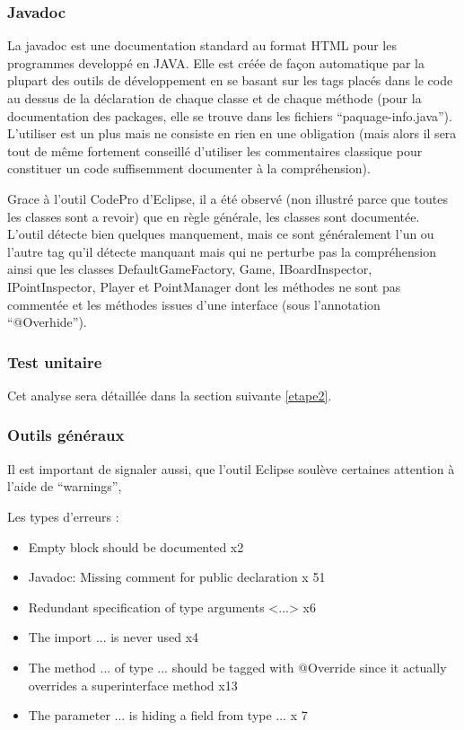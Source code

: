 \documentclass[12pt,a4paper,final]{article}
\begin{document}
\subsubsection{Javadoc}
La javadoc est une documentation standard au format HTML pour les programmes developpé en JAVA. Elle est créée de façon automatique par la plupart des outils de développement en se basant sur les tags placés dans le code au dessus de la déclaration de chaque classe et de chaque méthode (pour la documentation des packages, elle se trouve dans les fichiers "`paquage-info.java"').
L'utiliser est un plus mais ne consiste en rien en une obligation (mais alors il sera tout de même fortement conseillé d'utiliser les commentaires classique pour constituer un code suffisemment documenter à la compréhension).

Grace à l'outil CodePro d'Eclipse, il a été observé (non illustré parce que toutes les classes sont a revoir) que en règle générale, les classes sont documentée. L'outil détecte bien quelques manquement, mais ce sont généralement l'un ou l'autre tag qu'il détecte manquant mais qui ne perturbe pas la compréhension ainsi que les classes DefaultGameFactory, Game, IBoardInspector, IPointInspector, Player et PointManager dont les méthodes ne sont pas commentée et les méthodes issues d'une interface (sous l'annotation "`@Overhide"').

\subsubsection{}


\subsubsection{Test unitaire}
Cet analyse sera détaillée dans la section suivante \ref{etape2}.



\subsubsection{Outils généraux}
Il est important de signaler aussi, que l'outil Eclipse soulève certaines attention à l'aide de "`warnings"',  

Les types d'erreurs : 
\begin{itemize}
\item Empty block should be documented x2
\item Javadoc: Missing comment for public declaration x 51
\item Redundant specification of type arguments <...> x6
\item The import ... is never used x4
\item The method ... of type ... should be tagged with @Override since it actually overrides a superinterface method x13
\item The parameter ... is hiding a field from type ... x 7
\end {itemize}
\end{document}
